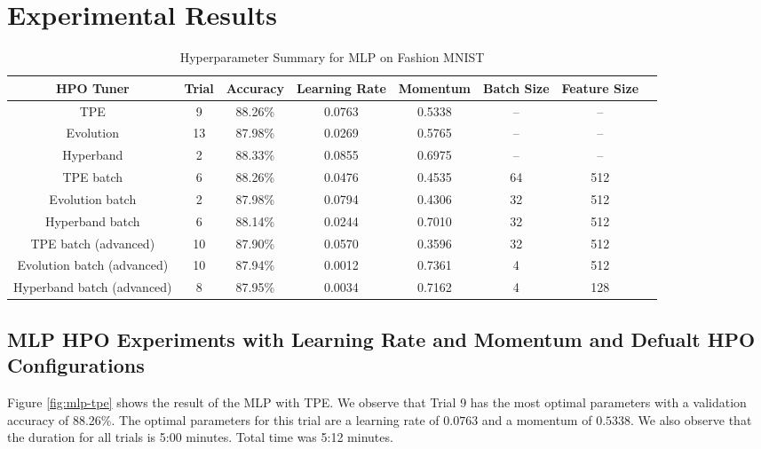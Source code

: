 \documentclass{article}
\begin{document}
\section{Experimental Results}

\begin{table}[ht]
\caption{Hyperparameter Summary for MLP on Fashion MNIST} %
\centering %
\begin{tabular}{c c c c c c c c } %
\hline\hline %
HPO Tuner & Trial & Accuracy & Learning Rate & Momentum & Batch Size & Feature Size \\ [0.5ex] %
\hline %
TPE                        & 9  & 88.26\% & 0.0763 & 0.5338 & -- & --  \\
Evolution                  & 13 & 87.98\% & 0.0269 & 0.5765 & -- & --  \\
Hyperband                  & 2  & 88.33\% & 0.0855 & 0.6975 & -- & --  \\
TPE batch                  & 6  & 88.26\% & 0.0476 & 0.4535 & 64 & 512 \\
Evolution batch            & 2  & 87.98\% & 0.0794 & 0.4306 & 32 & 512 \\
Hyperband batch            & 6  & 88.14\% & 0.0244 & 0.7010 & 32 & 512 \\
TPE batch (advanced)       & 10 & 87.90\% & 0.0570 & 0.3596 & 32 & 512 \\
Evolution batch (advanced) & 10 & 87.94\% & 0.0012 & 0.7361 & 4 & 512 \\
Hyperband batch (advanced) & 8  & 87.95\% & 0.0034 & 0.7162 & 4 & 128 \\
[1ex] %
\hline %
\end{tabular}
\label{table:summary} %
\end{table}


\subsection{MLP HPO Experiments with Learning Rate and Momentum and Defualt HPO Configurations}
Figure \ref{fig:mlp-tpe} shows the result of the MLP with TPE. We observe that Trial 9 has the most optimal parameters with a validation accuracy of 88.26\%. The optimal parameters for this trial are a learning rate of $0.0763$ and a momentum of $0.5338$. We also observe that the duration for all trials is 5:00 minutes. Total time was 5:12 minutes.
\end{document}
